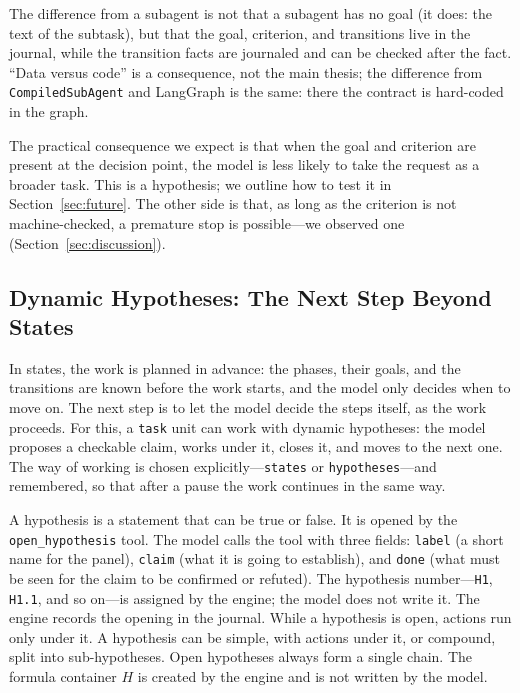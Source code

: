 \documentclass[11pt,a4paper]{article}
\begin{document}
The difference from a subagent is not that a subagent has no goal (it does: the text of the
subtask), but that the goal, criterion, and transitions live in the journal, while the
transition facts are journaled and can be checked after the fact. ``Data versus code'' is a
consequence, not the main thesis; the difference from \texttt{CompiledSubAgent} and LangGraph is
the same: there the contract is hard-coded in the graph.

The practical consequence we expect is that when the goal and criterion are present at the decision
point, the model is less likely to take the request as a broader task. This is a hypothesis; we
outline how to test it in Section~\ref{sec:future}. The other side is that, as long as the criterion is not
machine-checked, a premature stop is possible---we observed one
(Section~\ref{sec:discussion}).

\subsection{Dynamic Hypotheses: The Next Step Beyond States}
\label{sec:hypotheses}

In states, the work is planned in advance: the phases, their goals, and the transitions are known
before the work starts, and the model only decides when to move on. The next step is to let the
model decide the steps itself, as the work proceeds. For this, a \texttt{task} unit can work with
dynamic hypotheses: the model proposes a checkable claim, works under it, closes it, and moves to
the next one. The way of working is chosen explicitly---\texttt{states} or
\texttt{hypotheses}---and remembered, so that after a pause the work continues in the same way.

A hypothesis is a statement that can be true or false. It is opened by the
\texttt{open\_hypothesis} tool. The model calls the tool with three fields: \texttt{label} (a short
name for the panel), \texttt{claim} (what it is going to establish), and \texttt{done} (what must
be seen for the claim to be confirmed or refuted). The hypothesis number---\texttt{H1},
\texttt{H1.1}, and so on---is assigned by the engine; the model does not write it. The engine
records the opening in the journal. While a hypothesis is open, actions run only under it. A
hypothesis can be simple, with actions under it, or compound, split into sub-hypotheses. Open
hypotheses always form a single chain. The formula container $H$ is created by the engine and is
not written by the model.
\end{document}
